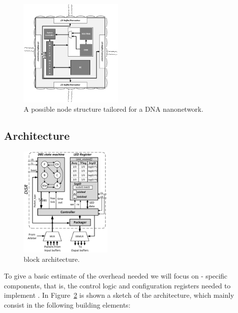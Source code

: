 \begin{figure}
  \centering
  \includegraphics[width=0.45\textwidth]{pictures/node_structure.eps}
  \caption{A possible node structure tailored for a DNA nanonetwork.}
 \label{fig:node_structure}
\end{figure}
\subsection{\disr{} Architecture}
\label{ssec:disr_architecture}

\begin{figure}
  \centering
  \includegraphics[width=0.40\textwidth]{pictures/disr_rtl_updated.eps}
  \caption{\emph{\disr{}} block architecture.}
 \label{fig:implementation}
\end{figure}

To give a basic estimate of the overhead needed we will focus on \disr{}-
specific components, that is, the control logic and configuration
registers needed to implement \disr{}. In Figure~\ref{fig:implementation}
is shown a sketch of the  architecture, which mainly consist in the
following building elements:

